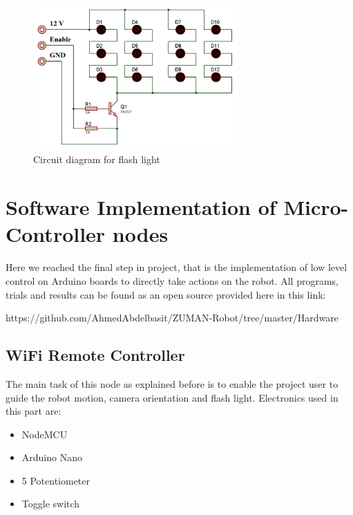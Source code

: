 \documentclass[12pt]{article}
\newcommand\blankpage{%
	\null
	\thispagestyle{empty}%
	\addtocounter{page}{-1}%
	\newpage}
\begin{document}
\begin{itemize}
	\begin{figure}[H]
		\centering
		\includegraphics[width =0.7\textwidth]{Fig/light-circuit.png}
		\caption{Circuit diagram for flash light}
		\label{fig:light-circuit}
	\end{figure}
\end{itemize}


\afterpage{\blankpage}
\newpage


\section{Software Implementation of Micro-Controller nodes}
Here we reached the final step in project, that is the implementation of low level control on Arduino boards to directly take actions on the robot. All programs, trials and results can be found as an open source provided here in this link:
\begin{center}
	 https://github.com/AhmedAbdelbasit/ZUMAN-Robot/tree/master/Hardware 
\end{center}


\subsection{WiFi Remote Controller}
	The main task of this node as explained before is to enable the project user to guide the robot motion, camera orientation and flash light. 
	Electronics used in this part are:
	\begin{itemize}
		\item NodeMCU
		\item Arduino Nano
		\item 5 Potentiometer
		\item Toggle switch\\
	\end{itemize}
\end{document}
